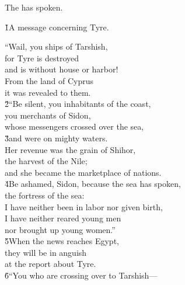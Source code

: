 The  has spoken.

\v{1}A message concerning Tyre.

\begin{poetry}
\poeml ``Wail, you ships of Tarshish, \\
\poeml for Tyre is destroyed \\
\poemlll       and is without house or harbor! \\
\poeml From the land of Cyprus \\
\poeml it was revealed to them. \\
\poeml \v{2}``Be silent, you inhabitants of the coast, \\
\poemll    you merchants of Sidon, \\
\poemlll       whose messengers crossed over the sea, \\
\poeml \v{3}and were on mighty waters. \\
\poemll    Her revenue was the grain of Shihor, \\
\poeml the harvest of the Nile; \\
\poemll    and she became the marketplace of nations. \\
\poeml \v{4}Be ashamed, Sidon, because the sea has spoken, \\
\poemll    the fortress of the sea: \\
\poeml I have neither been in labor nor given birth, \\
\poemll    I have neither reared young men \\
\poemlll       nor brought up young women.'' \\
\poeml \v{5}When the news reaches Egypt, \\
\poemll    they will be in anguish \\
\poemlll       at the report about Tyre. \\
\poeml \v{6}``You who are crossing over to Tarshish--- \\

\end{poetry}
